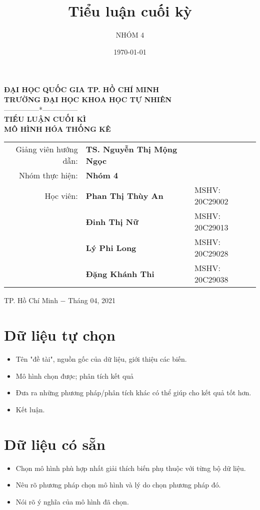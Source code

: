 \documentclass[a4paper]{book}
\title{Tiểu luận cuối kỳ}
\author{NHÓM 4}
\date{\today}%
\begin{document}
	
	\begin{titlepage}
		\thispagestyle{empty}
		\begin{center}
			\textbf{\large{ĐẠI HỌC QUỐC GIA TP. HỒ CHÍ MINH\\TRƯỜNG ĐẠI HỌC KHOA HỌC TỰ NHIÊN}}\\
			---------------*---------------\\
			\vspace*{5.5cm}
			{\textcolor[rgb]{0.0,0.0,1.0}{\textbf{\Large{TIỂU LUẬN CUỐI KÌ}}}}\\
			\vspace{1cm}
			\textbf{\huge{\textcolor[rgb]{1.0,0.0,0.0}{MÔ HÌNH HÓA THỐNG KÊ}}}\\
			\vspace*{4cm}
			\begin{tabular}{rll}
				{Giảng viên hướng dẫn:} &{\bf TS. Nguyễn Thị Mộng Ngọc} &  \\
				{Nhóm thực hiện:}     & {\textbf{Nhóm 4}} & \\
				{Học viên:} & {\textbf{Phan Thị Thùy An}} &{MSHV: 20C29002} \\
				& {\textbf{Đinh Thị Nữ }} &{MSHV: 20C29013} \\
				& {\textbf{Lý Phi Long}} &{MSHV: 20C29028} \\
				& {\textbf{Đặng Khánh Thi}} &{MSHV: 20C29038} 
			\end{tabular}
			\vfill
			\normalsize{TP. Hồ Chí Minh $-$ Tháng 04, 2021}
		\end{center}
	\end{titlepage}
\tableofcontents

\chapter{Dữ liệu tự chọn}
\begin{itemize}
	\item Tên "đề tài", nguồn gốc của dữ liệu, giới thiệu các biến.
	\item Mô hình chọn được; phân tích kết quả
	\item Đưa ra những phương pháp/phân tích khác có thể giúp cho kết quả tốt hơn.
	\item Kết luận.
\end{itemize}




\chapter{Dữ liệu có sẵn}
\begin{itemize}
	\item Chọn mô hình phù hợp nhất giải thích biến phụ thuộc với từng bộ dữ liệu.
	\item Nêu rõ phương pháp chọn mô hình và lý do chọn phương pháp đó.
	\item Nói rõ ý nghĩa của mô hình đã chọn.
\end{itemize}





\end{document}
